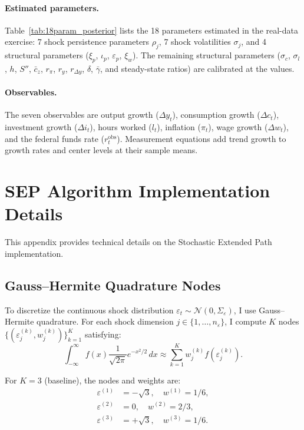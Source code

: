 \documentclass[12pt]{article}
\theoremstyle{plain}
\theoremstyle{definition}
\theoremstyle{remark}
\newcommand{\eps}{\varepsilon}
\begin{document}
\paragraph{Estimated parameters.} Table~\ref{tab:18param_posterior} lists the 18 parameters estimated in the real-data exercise: 7 shock persistence parameters $\rho_j$, 7 shock volatilities $\sigma_j$, and 4 structural parameters ($\xi_p$, $\iota_p$, $\varepsilon_p$, $\xi_w$). The remaining structural parameters ($\sigma_c$, $\sigma_l$, $h$, $S''$, $\bar{c}_z$, $r_\pi$, $r_y$, $r_{\Delta y}$, $\delta$, $\bar{\gamma}$, and steady-state ratios) are calibrated at the \citet{smets2007shocks} values.

\paragraph{Observables.} The seven observables are output growth ($\Delta y_t$), consumption growth ($\Delta c_t$), investment growth ($\Delta i_t$), hours worked ($l_t$), inflation ($\pi_t$), wage growth ($\Delta w_t$), and the federal funds rate ($r_t^{\text{obs}}$). Measurement equations add trend growth to growth rates and center levels at their sample means.


\section{SEP Algorithm Implementation Details}
\label{app:sep}

This appendix provides technical details on the Stochastic Extended Path implementation.


\subsection{Gauss--Hermite Quadrature Nodes}

To discretize the continuous shock distribution $\eps_t \sim \mathcal{N}(0, \Sigma_\eps)$, I use Gauss--Hermite quadrature. For each shock dimension $j \in \{1, \ldots, n_\eps\}$, I compute $K$ nodes $\{(\eps_j^{(k)}, w_j^{(k)})\}_{k=1}^K$ satisfying:
\begin{equation}
\int_{-\infty}^\infty f(x) \frac{1}{\sqrt{2\pi}} e^{-x^2/2} \, dx \approx \sum_{k=1}^K w_j^{(k)} f(\eps_j^{(k)}).
\end{equation}

For $K=3$ (baseline), the nodes and weights are:
\begin{align}
\eps^{(1)} &= -\sqrt{3}, \quad w^{(1)} = 1/6, \\
\eps^{(2)} &= 0, \quad w^{(2)} = 2/3, \\
\eps^{(3)} &= +\sqrt{3}, \quad w^{(3)} = 1/6.
\end{align}
\end{document}
